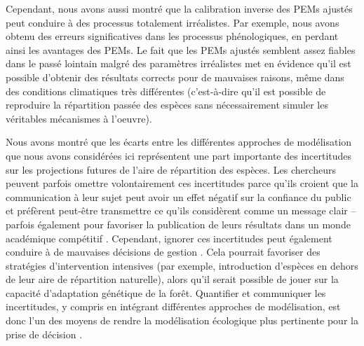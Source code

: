 Cependant, nous avons aussi montré que la calibration inverse des PEMs ajustés peut conduire à des processus totalement irréalistes. Par exemple, nous avons obtenu des erreurs significatives dans les processus phénologiques, en perdant ainsi les avantages des PEMs. Le fait que les PEMs ajustés semblent assez fiables dans le passé lointain malgré des paramètres irréalistes met en évidence qu’il est possible d’obtenir des résultats corrects pour de mauvaises raisons, même dans des conditions climatiques très différentes (c'est-à-dire qu'il est possible de reproduire la répartition passée des espèces sans nécessairement simuler les véritables mécanismes à l'oeuvre). 

Nous avons montré que les écarts entre les différentes approches de modélisation que nous avons considérées  ici représentent une part importante des incertitudes sur les projections futures de l’aire de répartition des espèces.  Les chercheurs peuvent parfois omettre volontairement ces incertitudes parce qu'ils croient que la communication à leur sujet peut avoir un effet négatif sur la confiance du public \citep{Howe2019, Simmonds2024} et préfèrent peut-être transmettre ce qu'ils considèrent comme un message clair -- parfois également pour favoriser la publication de leurs résultats dans un monde académique compétitif \citep{Yao2023}. Cependant, ignorer ces incertitudes peut également conduire à de mauvaises décisions de gestion \citep{Simmonds2024}. Cela pourrait favoriser des stratégies d’intervention intensives (par exemple, introduction d’espèces en dehors de leur aire de répartition naturelle), alors qu'il serait possible de jouer sur la capacité d’adaptation génétique de la forêt. Quantifier et communiquer les incertitudes, y compris en intégrant différentes approches de modélisation, est donc l’un des moyens de rendre la modélisation écologique plus pertinente pour la prise de décision \citep{Dietze2017, Saltelli2020}. 

